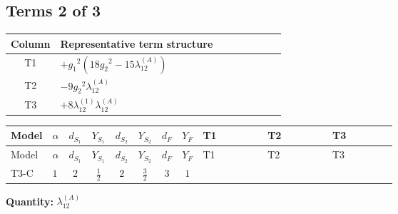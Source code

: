 \documentclass[8pt]{article}
\begin{document}
\begin{landscape}
\subsection*{Terms 2 of 3}
\begin{center}
\begin{tabular}{@{}c >{\raggedright\arraybackslash}p{0.82\linewidth}@{}}
\toprule
Column & Representative term structure \\
\midrule
T1 & \(\displaystyle +{g_1}^2 \left(18 {g_2}^2-15 {\lambda_{12}^{(A)}}\right)\) \\
\midrule
T2 & \(\displaystyle -9 {g_2}^2 {\lambda_{12}^{(A)}}\) \\
\midrule
T3 & \(\displaystyle +8 {\lambda_{12}^{(1)}} {\lambda_{12}^{(A)}}\) \\
\midrule
\bottomrule
\end{tabular}
\end{center}
\smallskip
\tiny
\begin{longtable}{@{}llcccccc >{\raggedright\arraybackslash}p{0.21\linewidth} >{\raggedright\arraybackslash}p{0.21\linewidth} >{\raggedright\arraybackslash}p{0.21\linewidth}@{}}
\toprule
Model & $\alpha$ & $d_{S_1}$ & $Y_{S_1}$ & $d_{S_2}$ & $Y_{S_2}$ & $d_F$ & $Y_F$ & T1 & T2 & T3 \\
\midrule
\endfirsthead
\toprule
Model & $\alpha$ & $d_{S_1}$ & $Y_{S_1}$ & $d_{S_2}$ & $Y_{S_2}$ & $d_F$ & $Y_F$ & T1 & T2 & T3 \\
\midrule
\endhead
T3-C & $1$ & $2$ & $\frac{1}{2}$ & $2$ & $\frac{3}{2}$ & $3$ & $1$ & \scriptsize\adjustbox{max width=\linewidth}{$\begin{gathered} +{g_1}^2 \left(18 {g_2}^2-15 {\lambda_{12}^{(A)}}\right)\end{gathered}$} & \scriptsize\adjustbox{max width=\linewidth}{$\begin{gathered} -9 {g_2}^2 {\lambda_{12}^{(A)}}\end{gathered}$} & \scriptsize\adjustbox{max width=\linewidth}{$\begin{gathered} +8 {\lambda_{12}^{(1)}} {\lambda_{12}^{(A)}}\end{gathered}$} \\
\midrule
\bottomrule
\end{longtable}
\clearpage
\noindent\textbf{Quantity: }$\lambda_{12}^{(A)}$\par\smallskip

\end{landscape}
\end{document}
